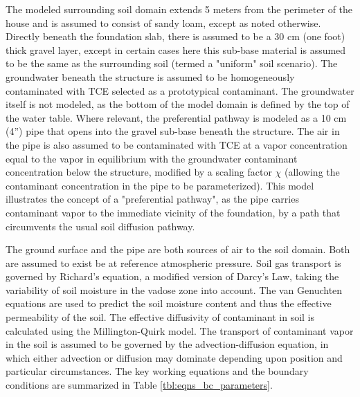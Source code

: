 \documentclass[journal=esthag,manuscript=article]{achemso}
\begin{document}
The modeled surrounding soil domain extends 5 meters from the perimeter of the house and is assumed to consist of sandy loam, except as noted otherwise.
Directly beneath the foundation slab, there is assumed to be a 30 cm (one foot) thick gravel layer, except in certain cases here this sub-base material is assumed to be the same as the surrounding soil (termed a "uniform" soil scenario).
The groundwater beneath the structure is assumed to be homogeneously contaminated with TCE selected as a prototypical contaminant.
The groundwater itself is not modeled, as the bottom of the model domain is defined by the top of the water table.
Where relevant, the preferential pathway is modeled as a 10 cm (4”) pipe that opens into the gravel sub-base beneath the structure.
The air in the pipe is also assumed to be contaminated with TCE at a vapor concentration equal to the vapor in equilibrium with the groundwater contaminant concentration below the structure, modified by a scaling factor $\chi$ (allowing the contaminant concentration in the pipe to be parameterized).
This model illustrates the concept of a "preferential pathway", as the pipe carries contaminant vapor to the immediate vicinity of the foundation, by a path that circumvents the usual soil diffusion pathway.\par

The ground surface and the pipe are both sources of air to the soil domain.
Both are assumed to exist be at reference atmospheric pressure.
Soil gas transport is governed by Richard’s equation, a modified version of Darcy’s Law, taking the variability of soil moisture in the vadose zone into account\cite{richards_capillary_1931}.
The van Genuchten equations are used to predict the soil moisture content and thus the effective permeability of the soil\cite{van_genuchten_closed-form_1980}.
The effective diffusivity of contaminant in soil is calculated using the Millington-Quirk model\cite{millington_permeability_1961}.
The transport of contaminant vapor in the soil is assumed to be governed by the advection-diffusion equation, in which either advection or diffusion may dominate depending upon position and particular circumstances.
The key working equations and the boundary conditions are summarized in Table \ref{tbl:eqns_bc_parameters}.\par
\end{document}
